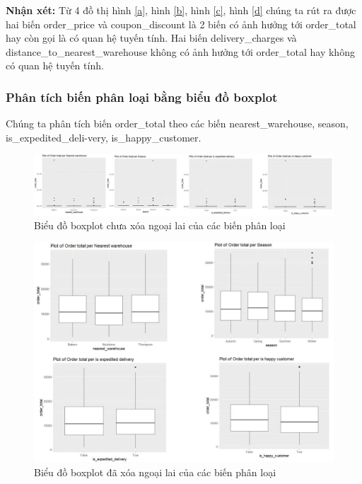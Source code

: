 \textbf{Nhận xét:} Từ 4 đồ thị hình \ref{a}, hình \ref{b}, hình \ref{c}, hình \ref{d} chúng ta rút ra được hai biến order\_price và coupon\_discount là 2 biến có ảnh hưởng tới order\_total hay còn gọi là có quan hệ tuyến tính. Hai biến delivery\_charges và distance\_to\_nearest\_warehouse không có ảnh hưởng tới order\_total hay không có quan hệ tuyến tính.

\subsubsection{Phân tích biến phân loại bằng biểu đồ boxplot}
Chúng ta phân tích biến order\_total theo các biến nearest\_warehouse, season, is\_expedited\_deli-very, is\_happy\_customer.
\begin{figure}[!htbp]
    \centering
    \includegraphics[width=1\linewidth]{graphics/bang13.jpg}
    \caption{Biểu đồ boxplot chưa xóa ngoại lai của các biến phân loại}
\end{figure}
\begin{figure}[!htbp]
    \centering
 \includegraphics[width=0.9\linewidth]{graphics/bang14.jpg}
 \caption{Biểu đồ boxplot đã xóa ngoại lai của các biến phân loại}
 \label{e}
\end{figure}


